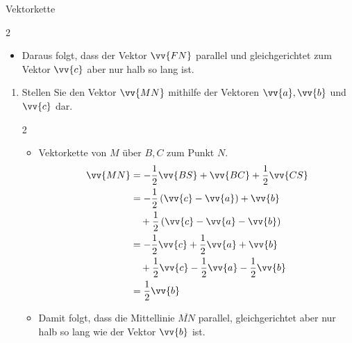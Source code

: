 \begin{bsp}{Vektorkette}{}
\begin{multicols}{2}
\begin{itemize}
    \end{itemize}
   \end{multicols}
   \begin{itemize}
       \item[$\circ$] Daraus folgt, dass der Vektor $\vv{FN}$ parallel und gleichgerichtet zum Vektor $\vv{c}$ aber nur halb so lang ist.
   \end{itemize}
   \begin{enumerate}
    \item[4.] Stellen Sie den Vektor $\vv{MN}$ mithilfe der Vektoren $\vv{a}, \vv{b}$ und $\vv{c}$ dar.
    \begin{multicols}{2}
    \begin{itemize}
        \item[$\circ$] Vektorkette von $M$ über $B, C$ zum Punkt $N$.
     \begin{equation*}
            \begin{split}
                \vv{MN} &= - \dfrac{1}{2}\vv{BS} + \vv{BC} + \dfrac{1}{2} \vv{CS}\\
                &= -\dfrac{1}{2} \left( \vv{c} - \vv{a}\right) +\vv{b}\\
                &\quad + \dfrac{1}{2} \left(\vv{c} - \vv{a} -\vv{b}\right)\\
                &= -\dfrac{1}{2} \vv{c} +\dfrac{1}{2} \vv{a} +\vv{b}\\
                &\quad + \dfrac{1}{2} \vv{c} - \dfrac{1}{2}\vv{a} -\dfrac{1}{2}\vv{b}\\
                &= \dfrac{1}{2} \vv{b}
            \end{split}
        \end{equation*}  
        \item[$\circ$] Damit folgt, dass die Mittellinie $\overline{MN}$ parallel, gleichgerichtet aber nur halb so lang wie der Vektor $\vv{b}$ ist.
    \end{itemize}
    \end{multicols}
\end{enumerate}
\end{bsp}
